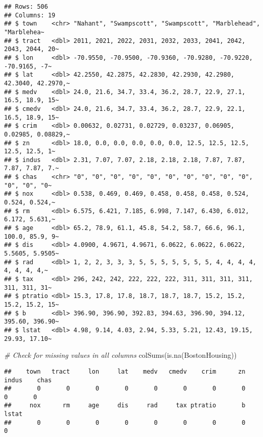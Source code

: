 \documentclass[
]{book}
\newenvironment{Shaded}{\begin{snugshade}}{\end{snugshade}}
\newcommand{\CommentTok}[1]{\textcolor[rgb]{0.56,0.35,0.01}{\textit{#1}}}
\newcommand{\FunctionTok}[1]{\textcolor[rgb]{0.00,0.00,0.00}{#1}}
\newcommand{\FunctionTok}[1]{\textcolor[rgb]{0.13,0.29,0.53}{\textbf{#1}}}
\newcommand{\NormalTok}[1]{#1}
\begin{document}
\begin{verbatim}
## Rows: 506
## Columns: 19
## $ town    <chr> "Nahant", "Swampscott", "Swampscott", "Marblehead", "Marblehea~
## $ tract   <dbl> 2011, 2021, 2022, 2031, 2032, 2033, 2041, 2042, 2043, 2044, 20~
## $ lon     <dbl> -70.9550, -70.9500, -70.9360, -70.9280, -70.9220, -70.9165, -7~
## $ lat     <dbl> 42.2550, 42.2875, 42.2830, 42.2930, 42.2980, 42.3040, 42.2970,~
## $ medv    <dbl> 24.0, 21.6, 34.7, 33.4, 36.2, 28.7, 22.9, 27.1, 16.5, 18.9, 15~
## $ cmedv   <dbl> 24.0, 21.6, 34.7, 33.4, 36.2, 28.7, 22.9, 22.1, 16.5, 18.9, 15~
## $ crim    <dbl> 0.00632, 0.02731, 0.02729, 0.03237, 0.06905, 0.02985, 0.08829,~
## $ zn      <dbl> 18.0, 0.0, 0.0, 0.0, 0.0, 0.0, 12.5, 12.5, 12.5, 12.5, 12.5, 1~
## $ indus   <dbl> 2.31, 7.07, 7.07, 2.18, 2.18, 2.18, 7.87, 7.87, 7.87, 7.87, 7.~
## $ chas    <chr> "0", "0", "0", "0", "0", "0", "0", "0", "0", "0", "0", "0", "0~
## $ nox     <dbl> 0.538, 0.469, 0.469, 0.458, 0.458, 0.458, 0.524, 0.524, 0.524,~
## $ rm      <dbl> 6.575, 6.421, 7.185, 6.998, 7.147, 6.430, 6.012, 6.172, 5.631,~
## $ age     <dbl> 65.2, 78.9, 61.1, 45.8, 54.2, 58.7, 66.6, 96.1, 100.0, 85.9, 9~
## $ dis     <dbl> 4.0900, 4.9671, 4.9671, 6.0622, 6.0622, 6.0622, 5.5605, 5.9505~
## $ rad     <dbl> 1, 2, 2, 3, 3, 3, 5, 5, 5, 5, 5, 5, 5, 4, 4, 4, 4, 4, 4, 4, 4,~
## $ tax     <dbl> 296, 242, 242, 222, 222, 222, 311, 311, 311, 311, 311, 311, 31~
## $ ptratio <dbl> 15.3, 17.8, 17.8, 18.7, 18.7, 18.7, 15.2, 15.2, 15.2, 15.2, 15~
## $ b       <dbl> 396.90, 396.90, 392.83, 394.63, 396.90, 394.12, 395.60, 396.90~
## $ lstat   <dbl> 4.98, 9.14, 4.03, 2.94, 5.33, 5.21, 12.43, 19.15, 29.93, 17.10~
\end{verbatim}

\begin{Shaded}
\begin{Highlighting}[]
\CommentTok{\# Check for missing values in all columns}
\FunctionTok{colSums}\NormalTok{(}\FunctionTok{is.na}\NormalTok{(BostonHousing))}
\end{Highlighting}
\end{Shaded}

\begin{verbatim}
##    town   tract     lon     lat    medv   cmedv    crim      zn   indus    chas 
##       0       0       0       0       0       0       0       0       0       0 
##     nox      rm     age     dis     rad     tax ptratio       b   lstat 
##       0       0       0       0       0       0       0       0       0
\end{verbatim}
\end{document}
